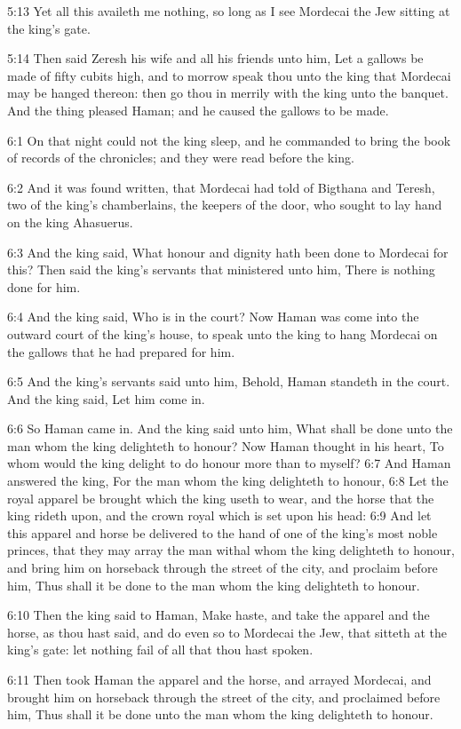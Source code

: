 5:13 Yet all this availeth me nothing, so long as I see Mordecai the Jew sitting at the king's gate.

5:14 Then said Zeresh his wife and all his friends unto him, Let a gallows be made of fifty cubits high, and to morrow speak thou unto the king that Mordecai may be hanged thereon: then go thou in merrily with the king unto the banquet. And the thing pleased Haman; and he caused the gallows to be made.

6:1 On that night could not the king sleep, and he commanded to bring the book of records of the chronicles; and they were read before the king.

6:2 And it was found written, that Mordecai had told of Bigthana and Teresh, two of the king's chamberlains, the keepers of the door, who sought to lay hand on the king Ahasuerus.

6:3 And the king said, What honour and dignity hath been done to Mordecai for this? Then said the king's servants that ministered unto him, There is nothing done for him.

6:4 And the king said, Who is in the court? Now Haman was come into the outward court of the king's house, to speak unto the king to hang Mordecai on the gallows that he had prepared for him.

6:5 And the king's servants said unto him, Behold, Haman standeth in the court. And the king said, Let him come in.

6:6 So Haman came in. And the king said unto him, What shall be done unto the man whom the king delighteth to honour? Now Haman thought in his heart, To whom would the king delight to do honour more than to myself?  6:7 And Haman answered the king, For the man whom the king delighteth to honour, 6:8 Let the royal apparel be brought which the king useth to wear, and the horse that the king rideth upon, and the crown royal which is set upon his head: 6:9 And let this apparel and horse be delivered to the hand of one of the king's most noble princes, that they may array the man withal whom the king delighteth to honour, and bring him on horseback through the street of the city, and proclaim before him, Thus shall it be done to the man whom the king delighteth to honour.

6:10 Then the king said to Haman, Make haste, and take the apparel and the horse, as thou hast said, and do even so to Mordecai the Jew, that sitteth at the king's gate: let nothing fail of all that thou hast spoken.

6:11 Then took Haman the apparel and the horse, and arrayed Mordecai, and brought him on horseback through the street of the city, and proclaimed before him, Thus shall it be done unto the man whom the king delighteth to honour.

